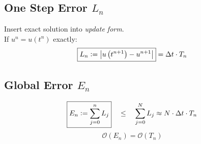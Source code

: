 \subsection{One Step Error \texorpdfstring{$L_n$}{Ln}}
    Insert exact solution into \textit{update form}.\\
    If $u^n = u (t^n)$ exactly:
    $$
       \boxed{L_n \vcentcolon= \abs{u\left(t^{n+1}\right) - u^{n+1}}} = \Delta t \cdot T_n
    $$
    \vfill \null \columnbreak
\subsection{Global Error \texorpdfstring{$E_n$}{En}}
    \vspace{-0.5em}
    $$
        \boxed{E_n \vcentcolon= \sum_{j=0}^{n}L_j} \quad \leq \quad \sum_{j=0}^N L_j \approx N \cdot \Delta t \cdot T_n
    $$
    $$
        \mathcal{O}(E_n) = \mathcal{O}(T_n)
    $$
    \vspace{-1.5em}